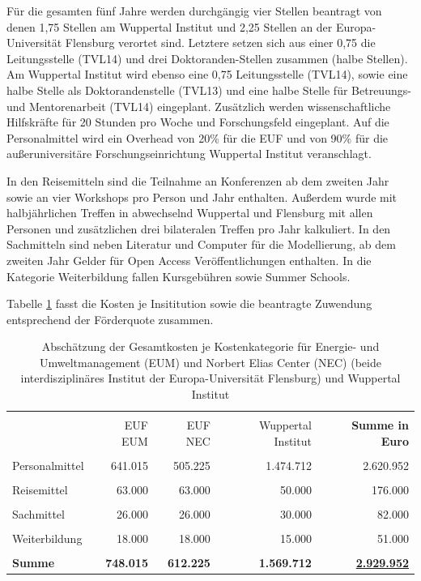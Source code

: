 \documentclass[a4paper,11pt,twoside]{scrartcl}
\begin{document}
Für die gesamten fünf Jahre werden durchgängig vier Stellen beantragt von denen 1,75 Stellen am Wuppertal Institut und 2,25 Stellen an der Europa-Universität Flensburg verortet sind. Letztere setzen sich aus einer 0,75 die Leitungsstelle (TVL14) und drei Doktoranden-Stellen zusammen (halbe Stellen). Am Wuppertal Institut wird ebenso eine 0,75 Leitungsstelle (TVL14), sowie eine halbe Stelle als Doktorandenstelle (TVL13) und eine halbe Stelle für Betreuungs- und Mentorenarbeit (TVL14) eingeplant. Zusätzlich werden wissenschaftliche Hilfskräfte für 20 Stunden pro Woche und Forschungsfeld eingeplant. Auf die Personalmittel wird ein Overhead von 20\% für die EUF und von 90\% für die außeruniversitäre Forschungseinrichtung Wuppertal Institut veranschlagt.

In den Reisemitteln sind die Teilnahme an Konferenzen ab dem zweiten Jahr sowie an vier Workshops pro Person und Jahr enthalten. Außerdem wurde mit halbjährlichen Treffen in abwechselnd Wuppertal und Flensburg mit allen Personen und zusätzlichen drei bilateralen Treffen pro Jahr kalkuliert. In den Sachmitteln sind neben Literatur und Computer für die Modellierung, ab dem zweiten Jahr Gelder für Open Access Veröffentlichungen enthalten. In die Kategorie Weiterbildung fallen Kursgebühren sowie Summer Schools.

Tabelle \ref{tab:kostenkalkulation} fasst die Kosten je Insititution sowie die beantragte Zuwendung entsprechend der Förderquote zusammen.

\begin{table}[h]
\begin{center}
  \caption{Abschätzung der Gesamtkosten je Kostenkategorie für Energie- und Umweltmanagement (EUM) und Norbert Elias Center (NEC) (beide interdisziplinäres Institut der Europa-Universität Flensburg) und Wuppertal Institut}
  
\begin{tabular}[h]{|l | r | r | r | r|}
\hline
&&&&\\
& EUF EUM & EUF NEC & Wuppertal Institut & \textbf{Summe in Euro}\\
\hline
\hline
&&&&\\
 Personalmittel & 641.015 & 505.225 & 1.474.712 & 2.620.952\\
 \hline
 &&&&\\
 Reisemittel & 63.000 & 63.000 & 50.000 & 176.000\\
 \hline
 &&&&\\
 Sachmittel & 26.000 & 26.000 & 30.000 & 82.000\\
 \hline
 &&&&\\
 Weiterbildung & 18.000 & 18.000 & 15.000 & 51.000\\
 \hline
 \hline
 &&&&\\
 \textbf{Summe}& \textbf{748.015} & \textbf{612.225} & \textbf{1.569.712} & \underline{\textbf{2.929.952}}\\
 \hline
 \end{tabular}
 \label{tab:kostenkalkulation}
\end{center}
\end{table}
\end{document}
